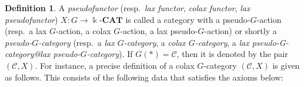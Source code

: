 \documentclass{surv-l}
\numberwithin{equation}{chapter}
\numberwithin{figure}{chapter}
\theoremstyle{plain}
\theoremstyle{definition}
\newtheorem{dfn}[thm]{Definition}
\theoremstyle{remark}
\newcommand{\kCAT}{\Bbbk\text{-}\mathbf{CAT}}
\begin{document}
\begin{dfn}\label{dfn:weak-G-cat}
A \emph{pseudofunctor} (resp.\ \emph{lax functor}, \emph{colax functor}, \emph{lax pseudofunctor})
$X\colon G \to \kCAT$ is called a category with a pseudo-$G$-action
(resp.\ a lax $G$-action, a colax $G$-action, a lax pseudo-$G$-action)
or shortly a \emph{pseudo-$G$-category}
(resp.\ a \emph{lax $G$-category}, a \emph{colax
  $G$-category}, a \emph{lax pseudo-G-category@lax pseudo-$G$-category}).
If $G(*)={\mathcal{C}}$, then it is denoted by the pair $({\mathcal{C}}, X)$.
For instance, a precise definition of a colax $G$-category $({\mathcal{C}}, X)$ is given as follows.
This consists of the following data that satisfies the axioms below:


\end{dfn}
\end{document}
